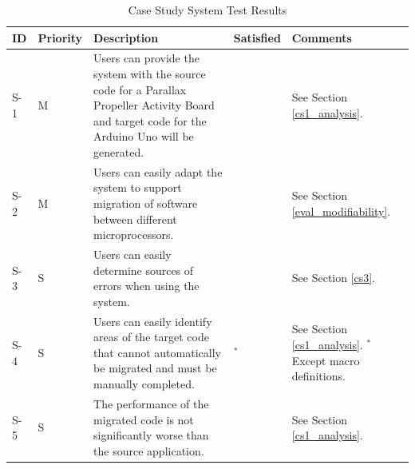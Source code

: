 \documentclass{UoYCSproject}
\newcommand{\ra}[1]{\renewcommand{\arraystretch}{#1}}
\newcommand{\xmark}{\ding{55}}%
\renewcommand{\checkmark}{\ding{51}}
\begin{document}
\begin{landscape}
\begin{table}[h!]
\caption{Case Study System Test Results}
\centering
\ra{1.3}
  \begin{tabular}{@{}p{}p{}p{}p{}p{}@{}} \toprule 
  \textbf{ID} & \textbf{Priority} & \textbf{Description} & \textbf{Satisfied} & \textbf{Comments} \\
  \midrule
  S-1 & M & Users can provide the system with the source code for a Parallax Propeller Activity Board and target code for the Arduino Uno will be generated. & \checkmark & See Section \ref{cs1_analysis}. \\ 
  S-2 & M & Users can easily adapt the system to support migration of software between different microprocessors. & \checkmark & See Section \ref{eval_modifiability}. \\
  S-3 & S & Users can easily determine sources of errors when using the system. & \xmark & See Section \ref{cs3}. \\
  S-4 & S & Users can easily identify areas of the target code that cannot automatically be migrated and must be manually completed. & \checkmark$^*$ & See Section \ref{cs1_analysis}. $^*$Except macro definitions. \\
  S-5 & S & The performance of the migrated code is not significantly worse than the source application. & \checkmark & See Section \ref{cs1_analysis}. \\
  \bottomrule
  \end{tabular}
\label{table:case_study_sys_test_results}
\end{table}

\clearpage

\ra{1.3}


\end{landscape}
\end{document}
